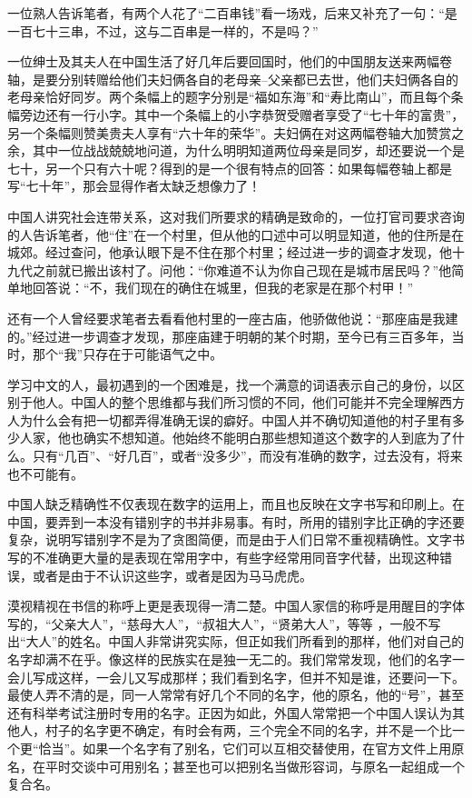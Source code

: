 \documentclass[12pt,oneside]{book}
\begin{document}
\begin{common-format}
一位熟人告诉笔者，有两个人花了“二百串钱”看一场戏，后来又补充了一句：“是一百七十三串，不过，这与二百串是一样的，不是吗？” 

一位绅士及其夫人在中国生活了好几年后要回国时，他们的中国朋友送来两幅卷轴，是要分别转赠给他们夫妇俩各自的老母亲--父亲都已去世，他们夫妇俩各自的老母亲恰好同岁。两个条幅上的题字分别是“福如东海”和“寿比南山”，而且每个条幅旁边还有一行小字。其中一个条幅上的小字恭贺受赠者享受了“七十年的富贵”，另一个条幅则赞美贵夫人享有“六十年的荣华”。夫妇俩在对这两幅卷轴大加赞赏之余，其中一位战战兢兢地问道，为什么明明知道两位母亲是同岁，却还要说一个是七十，另一个只有六十呢？得到的是一个很有特点的回答：如果每幅卷轴上都是写“七十年”，那会显得作者太缺乏想像力了！ 

中国人讲究社会连带关系，这对我们所要求的精确是致命的，一位打官司要求咨询的人告诉笔者，他“住”在一个村里，但从他的口述中可以明显知道，他的住所是在城郊。经过查问，他承认眼下是不住在那个村里；经过进一步的调查才发现，他十九代之前就已搬出该村了。问他：“你难道不认为你自己现在是城市居民吗？”他简单地回答说：“不，我们现在的确住在城里，但我的老家是在那个村甲！” 

还有一个人曾经要求笔者去看看他村里的一座古庙，他骄做他说：“那座庙是我建的。”经过进一步调查才发现，那座庙建于明朝的某个时期，至今已有三百多年，当时，那个“我”只存在于可能语气之中。 

学习中文的人，最初遇到的一个困难是，找一个满意的词语表示自己的身份，以区别于他人。中国人的整个思维都与我们所习惯的不同，他们可能并不完全理解西方人为什么会有把一切都弄得准确无误的癖好。中国人并不确切知道他的村子里有多少人家，他也确实不想知道。他始终不能明白那些想知道这个数字的人到底为了什么。只有“几百”、“好几百”，或者“没多少”，而没有准确的数字，过去没有，将来也不可能有。 

中国人缺乏精确性不仅表现在数字的运用上，而且也反映在文字书写和印刷上。在中国，要弄到一本没有错别字的书并非易事。有时，所用的错别字比正确的字还要复杂，说明写错别字不是为了贪图简便，而是由于人们日常不重视精确性。文字书写的不准确更大量的是表现在常用字中，有些字经常用同音字代替，出现这种错误，或者是由于不认识这些字，或者是因为马马虎虎。 

漠视精视在书信的称呼上更是表现得一清二楚。中国人家信的称呼是用醒目的字体写的，“父亲大人”，“慈母大人”，“叔祖大人”，“贤弟大人”，等等 ，一般不写出“大人”的姓名。中国人非常讲究实际，但正如我们所看到的那样，他们对自己的名字却满不在乎。像这样的民族实在是独一无二的。我们常常发现，他们的名字一会儿写成这样，一会儿又写成那样；我们看到名字，但并不知是谁，还要问一下。最使人弄不清的是，同一人常常有好几个不同的名字，他的原名，他的“号”，甚至还有科举考试注册时专用的名字。正因为如此，外国人常常把一个中国人误认为其他人，村子的名字更不确定，有时会有两，三个完全不同的名字，并不是一个比一个更“恰当”。如果一个名字有了别名，它们可以互相交替使用，在官方文件上用原名，在平时交谈中可用别名；甚至也可以把别名当做形容词，与原名一起组成一个复合名。 


\end{common-format}
\end{document}
